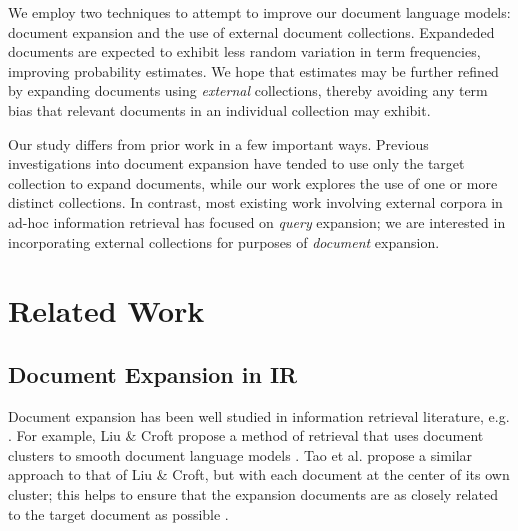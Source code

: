 \documentclass{sig-alternate}
\begin{document}
We employ two techniques to attempt to improve our document language models: document expansion and the use of external document collections. Expandeded documents are expected to exhibit less random variation in term frequencies, improving probability estimates. We hope that estimates may be further refined by expanding documents using \textit{external} collections, thereby avoiding any term bias that relevant documents in an individual collection may exhibit.



Our study differs from prior work in a few important ways. Previous investigations into document expansion have tended to use only the target collection to expand documents, while our work explores the use of one or more distinct collections. In contrast, most existing work involving external corpora in ad-hoc information retrieval has focused on \textit{query} expansion; we are interested in incorporating external collections for purposes of \textit{document} expansion.

\section{Related Work}\label{section.related}

\subsection{Document Expansion in IR}\label{section.related.ir}

Document expansion has been well studied in information retrieval literature, e.g. \cite{Liu2004, Tao2006, Wei2006, Hubert2009, Singhal1999}. For example, Liu \& Croft propose a method of retrieval that uses document clusters to smooth document language models \cite{Liu2004}. Tao et al. propose a similar approach to that of Liu \& Croft, but with each document at the center of its own cluster; this helps to ensure that the expansion documents are as closely related to the target document as possible \cite{Tao2006}.
\end{document}
